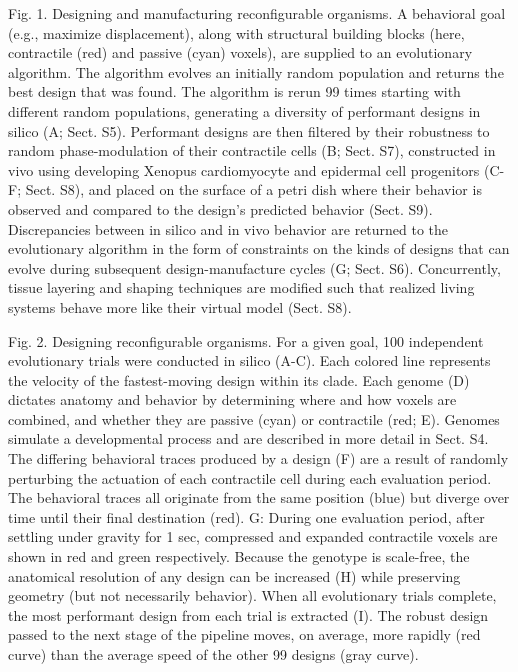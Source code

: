 Fig. 1.  Designing and manufacturing reconfigurable organisms. A behavioral goal (e.g., maximize displacement), along with structural building blocks (here, contractile (red) and passive (cyan) voxels), are supplied to an evolutionary algorithm. The algorithm evolves an initially random population and returns the best design that was found. The algorithm is rerun 99 times starting with different random populations, generating a diversity of performant designs in silico (A; Sect. S5). Performant designs are then filtered by their robustness to random phase-modulation of their contractile cells (B; Sect. S7), constructed in vivo using developing Xenopus cardiomyocyte and epidermal cell progenitors (C-F; Sect. S8), and placed on the surface of a petri dish where their behavior is observed and compared to the design's predicted behavior (Sect. S9). Discrepancies between in silico and in vivo behavior are returned to the evolutionary algorithm in the form of constraints on the kinds of designs that can evolve during subsequent design-manufacture cycles (G; Sect. S6). Concurrently, tissue layering and shaping techniques are modified such that realized living systems behave more like their virtual model (Sect. S8).



Fig. 2.  Designing reconfigurable organisms. For a given goal, 100 independent evolutionary trials were conducted in silico (A-C). Each colored line represents the velocity of the fastest-moving design within its clade. Each genome (D) dictates anatomy and behavior by determining where and how voxels are combined, and whether they are passive (cyan) or contractile (red; E). Genomes simulate a developmental process and are described in more detail in Sect. S4. The differing behavioral traces produced by a design (F) are a result of randomly perturbing the actuation of each contractile cell during each evaluation period. The behavioral traces all originate from the same position (blue) but diverge over time until their final destination (red). G: During one evaluation period, after settling under gravity for 1 sec, compressed and expanded contractile voxels are shown in red and green respectively. Because the genotype is scale-free, the anatomical resolution of any design can be increased (H) while preserving geometry (but not necessarily behavior). When all evolutionary trials complete, the most performant design from each trial is extracted (I). The robust design passed to the next stage of the pipeline moves, on average, more rapidly (red curve) than the average speed of the other 99 designs (gray curve).


